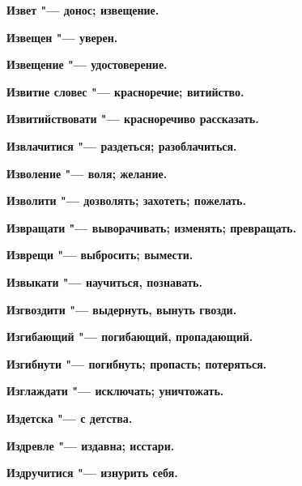\bfseries Извет \normalfont{} "--- донос; извещение. 




\bfseries Извещен \normalfont{} "--- уверен. 




\bfseries Извещение \normalfont{} "--- удостоверение. 




\bfseries Извитие словес \normalfont{} "--- красноречие; витийство. 




\bfseries Извитийствовати \normalfont{} "--- красноречиво рассказать. 




\bfseries Извлачитися \normalfont{} "--- раздеться; разоблачиться. 




\bfseries Изволение \normalfont{} "--- воля; желание. 




\bfseries Изволити \normalfont{} "--- дозволять; захотеть; пожелать. 




\bfseries Извращати \normalfont{} "--- выворачивать; изменять; превращать. 




\bfseries Изврещи \normalfont{} "--- выбросить; вымести. 




\bfseries Извыкати \normalfont{} "--- научиться, познавать. 




\bfseries Изгвоздити \normalfont{} "--- выдернуть, вынуть гвозди. 




\bfseries Изгибающий \normalfont{} "--- погибающий, пропадающий. 




\bfseries Изгибнути \normalfont{} "--- погибнуть; пропасть; потеряться. 




\bfseries Изглаждати \normalfont{} "--- исключать; уничтожать. 




\bfseries Издетска \normalfont{} "--- с детства. 




\bfseries Издревле \normalfont{} "--- издавна; исстари. 




\bfseries Издручитися \normalfont{} "--- изнурить себя. 




